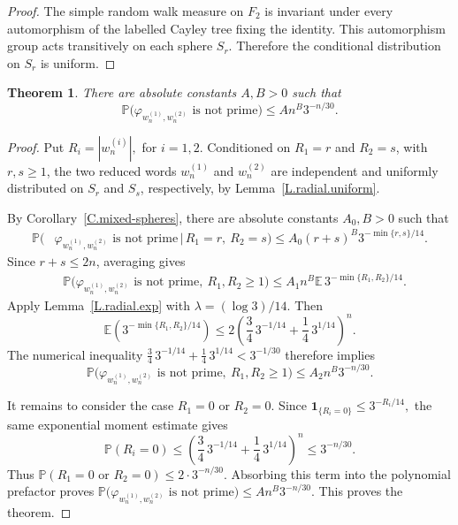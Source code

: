 \documentclass{amsproc}
\newtheorem{theorem}{Theorem}[section]
\newcommand{\Prob}{\mathbb P}
\newcommand{\E}{\mathbb E}
\begin{document}
\begin{proof}
The simple random walk measure on $F_2$ is invariant under every automorphism of
the labelled Cayley tree fixing the identity.  This automorphism group acts transitively on each sphere $S_r$.
Therefore the conditional distribution on $S_r$ is uniform.
\end{proof}

\begin{theorem}\label{T.random-walk}
There are absolute constants $A,B>0$ such that
\[
        \Prob\bigl(\varphi_{w_n^{(1)},w_n^{(2)}}\text{ is not prime}\bigr)
        \leq A n^B 3^{-n/30}.
\]
\end{theorem}

\begin{proof}
Put
$
        R_i=|w_n^{(i)}|,$ for $i=1,2$.
Conditioned on $R_1=r$ and $R_2=s$, with $r,s\geq 1$, the two reduced words
$w_n^{(1)}$ and $w_n^{(2)}$ are independent and uniformly distributed on
$S_r$ and $S_s$, respectively, by Lemma~\ref{L.radial.uniform}.

By Corollary~\ref{C.mixed-spheres}, there are absolute constants $A_0,B>0$
such that
\[
\begin{aligned}
        \Prob\bigl(&\varphi_{w_n^{(1)},w_n^{(2)}}\text{ is not prime}
        \,\big|\, R_1=r,\ R_2=s\bigr)
        \leq A_0 (r+s)^B 3^{-\min\{r,s\}/14}.
\end{aligned}
\]
Since $r+s\leq 2n$, averaging gives
\[
\begin{aligned}
&\Prob\bigl(\varphi_{w_n^{(1)},w_n^{(2)}}\text{ is not prime},\ R_1,R_2\geq 1\bigr)
\leq A_1 n^B \E\,3^{-\min\{R_1,R_2\}/14}.
\end{aligned}
\]
Apply Lemma~\ref{L.radial.exp} with $\lambda=(\log 3)/14$.  Then
\[
        \E\left(3^{-\min\{R_1,R_2\}/14}\right)
        \leq
        2\left(\frac34\,3^{-1/14}+\frac14\,3^{1/14}\right)^n.
\]
The numerical inequality
$
        \frac34\,3^{-1/14}+\frac14\,3^{1/14}
        <
        3^{-1/30}
$
therefore implies
\[
        \Prob\bigl(\varphi_{w_n^{(1)},w_n^{(2)}}\text{ is not prime},\ R_1,R_2\geq 1\bigr)
        \leq
        A_2 n^B 3^{-n/30}.
\]

It remains to consider the case $R_1=0$ or $R_2=0$.  Since
$
        \mathbf 1_{\{R_i=0\}}\leq 3^{-R_i/14},
$
the same exponential moment estimate gives
\[
        \Prob(R_i=0)
        \leq
        \left(\frac34\,3^{-1/14}+\frac14\,3^{1/14}\right)^n
        \leq
        3^{-n/30}.
\]
Thus
$
        \Prob(R_1=0\text{ or }R_2=0)
        \leq
        2 \cdot 3^{-n/30}.
$
Absorbing this term into the polynomial prefactor proves
$
        \Prob\bigl(\varphi_{w_n^{(1)},w_n^{(2)}}\text{ is not prime}\bigr)
        \leq A n^B 3^{-n/30}.
$
This proves the theorem.
\end{proof}
\end{document}
